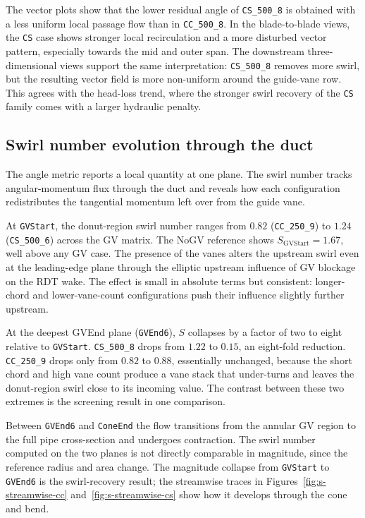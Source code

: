 The vector plots show that the lower residual angle of \texttt{CS\_500\_8} is obtained with a less uniform local passage flow than in \texttt{CC\_500\_8}. In the blade-to-blade views, the \texttt{CS} case shows stronger local recirculation and a more disturbed vector pattern, especially towards the mid and outer span. The downstream three-dimensional views support the same interpretation: \texttt{CS\_500\_8} removes more swirl, but the resulting vector field is more non-uniform around the guide-vane row. This agrees with the head-loss trend, where the stronger swirl recovery of the \texttt{CS} family comes with a larger hydraulic penalty.


\subsection{Swirl number evolution through the duct}
\label{sec:swirl-number-evolution}

The angle metric reports a local quantity at one plane. The swirl number tracks angular-momentum flux through the duct and reveals how each configuration redistributes the tangential momentum left over from the guide vane.

At \texttt{GVStart}, the donut-region swirl number ranges from $0.82$ (\texttt{CC\_250\_9}) to $1.24$ (\texttt{CS\_500\_6}) across the GV matrix. The NoGV reference shows $S_{\mathrm{GVStart}} = 1.67$, well above any GV case. The presence of the vanes alters the upstream swirl even at the leading-edge plane through the elliptic upstream influence of GV blockage on the RDT wake. The effect is small in absolute terms but consistent: longer-chord and lower-vane-count configurations push their influence slightly further upstream.

At the deepest GVEnd plane (\texttt{GVEnd6}), $S$ collapses by a factor of two to eight relative to \texttt{GVStart}. \texttt{CS\_500\_8} drops from $1.22$ to $0.15$, an eight-fold reduction. \texttt{CC\_250\_9} drops only from $0.82$ to $0.88$, essentially unchanged, because the short chord and high vane count produce a vane stack that under-turns and leaves the donut-region swirl close to its incoming value. The contrast between these two extremes is the screening result in one comparison.

Between \texttt{GVEnd6} and \texttt{ConeEnd} the flow transitions from the annular GV region to the full pipe cross-section and undergoes contraction. The swirl number computed on the two planes is not directly comparable in magnitude, since the reference radius and area change. The magnitude collapse from \texttt{GVStart} to \texttt{GVEnd6} is the swirl-recovery result; the streamwise traces in Figures~\ref{fig:s-streamwise-cc} and~\ref{fig:s-streamwise-cs} show how it develops through the cone and bend.

